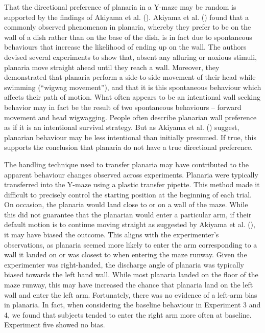 \documentclass[
  jou,
  floatsintext,
  longtable,
  nolmodern,
  notxfonts,
  notimes,
  donotrepeattitle,
  colorlinks=true,linkcolor=blue,citecolor=blue,urlcolor=blue]{apa7}
\begin{document}
That the directional preference of planaria in a Y-maze may be random is
supported by the findings of Akiyama et al.
(). Akiyama et al.
() found that a commonly
observed phenomenon in planaria, whereby they prefer to be on the wall
of a dish rather than on the base of the dish, is in fact due to
spontaneous behaviours that increase the likelihood of ending up on the
wall. The authors devised several experiments to show that, absent any
alluring or noxious stimuli, planaria move straight ahead until they
reach a wall. Moreover, they demonstrated that planaria perform a
side-to-side movement of their head while swimming (``wigwag
movement''), and that it is this spontaneous behaviour which affects
their path of motion. What often appears to be an intentional wall
seeking behavior may in fact be the result of two spontaneous behaviours
-- forward movement and head wigwagging. People often describe planarian
wall preference as if it is an intentional survival strategy. But as
Akiyama et al. () suggest,
planarian behaviour may be less intentional than initially presumed. If
true, this supports the conclusion that planaria do not have a true
directional preference.

The handling technique used to transfer planaria may have contributed to
the apparent behaviour changes observed across experiments. Planaria
were typically transferred into the Y-maze using a plastic transfer
pipette. This method made it difficult to precisely control the starting
position at the beginning of each trial. On occasion, the planaria would
land close to or on a wall of the maze. While this did not guarantee
that the planarian would enter a particular arm, if their default motion
is to continue moving straight as suggested by Akiyama et al.
(), it may have biased the
outcome. This aligns with the experimenter's observations, as planaria
seemed more likely to enter the arm corresponding to a wall it landed on
or was closest to when entering the maze runway. Given the experimenter
was right-handed, the discharge angle of planaria was typically biased
towards the left hand wall. While most planaria landed on the floor of
the maze runway, this may have increased the chance that planaria land
on the left wall and enter the left arm. Fortunately, there was no
evidence of a left-arm bias in planaria. In fact, when considering the
baseline behaviour in Experiment 3 and 4, we found that subjects tended
to enter the right arm more often at baseline. Experiment five showed no
bias.
\end{document}
